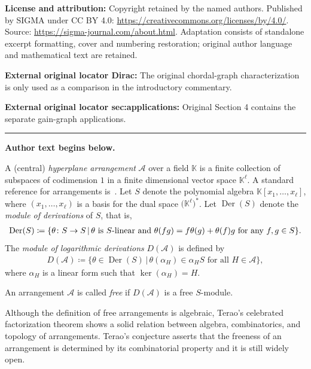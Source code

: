 \documentclass[11pt]{article}
\DeclareMathOperator*{\Der}{Der}
\begin{document}
\noindent\textbf{License and attribution:} Copyright retained by the named authors. Published by SIGMA under CC BY 4.0: \url{https://creativecommons.org/licenses/by/4.0/}. Source: \url{https://sigma-journal.com/about.html}. Adaptation consists of standalone excerpt formatting, cover and numbering restoration; original author language and mathematical text are retained.\par
\noindent\textbf{External original locator Dirac:} The original chordal-graph characterization is only used as a comparison in the introductory commentary.\par
\noindent\textbf{External original locator sec:applications:} Original Section 4 contains the separate gain-graph applications.\par
\medskip\hrule\medskip\noindent\textbf{Author text begins below.}\par
\setcounter{section}{1}
\setcounter{subsection}{0}
\setcounter{subsubsection}{0}
\setcounter{Theorem}{0}
\setcounter{equation}{0}
A (central) \textit{hyperplane arrangement} $ \mathcal{A} $ over a field $ \mathbb{K} $ is a finite collection of subspaces of codimension $ 1 $ in a finite dimensional vector space $ \mathbb{K}^{\ell} $.
A standard reference for arrangements is~\cite{orlik1992arrangements}.
Let $ S $ denote the polynomial algebra $ \mathbb{K}[x_{1}, \dots, x_{\ell}] $, where $ (x_{1}, \dots, x_{\ell}) $ is a basis for the dual space $ \big(\mathbb{K}^{\ell}\big) ^{\ast} $.
Let $ \Der(S) $ denote the \textit{module of derivations} of $ S $, that is,
\begin{gather*}
\Der(S) \coloneqq \{ \theta \colon S \to S \,|\, \theta \text{ is $ S $-linear and } \theta(fg) = f\theta(g) + \theta(f)g \text{ for any } f,g \in S \}.
\end{gather*}
The \textit{module of logarithmic derivations} $ D(\mathcal{A}) $ is defined by
\begin{gather*}
D(\mathcal{A}) \coloneqq \{ \theta \in \Der(S) \,|\, \theta(\alpha_{H}) \in \alpha_{H}S \text{ for all } H \in \mathcal{A} \},
\end{gather*}
where $ \alpha_{H} $ is a linear form such that $ \ker(\alpha_{H}) = H $.

\begin{Definition}
An arrangement $ \mathcal{A} $ is called \textit{free} if $ D(\mathcal{A}) $ is a free $ S $-module.
\end{Definition}

Although the definition of free arrangements is algebraic, Terao's celebrated factorization theorem \cite[Main Theorem]{terao1981generalized-im} shows a solid relation between algebra, combinatorics, and topology of arrangements.
Terao's conjecture asserts that the freeness of an arrangement is determined by its combinatorial property and it is still widely open.
\end{document}
